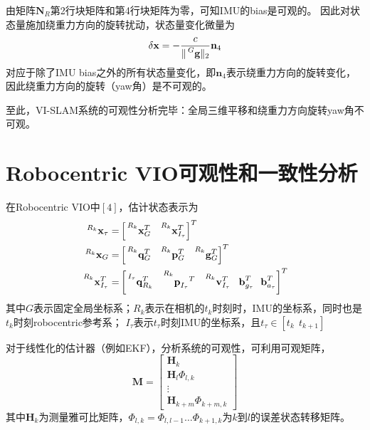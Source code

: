 \documentclass{article}
\begin{document}
由矩阵$\textbf{N}_R$第2行块矩阵和第4行块矩阵为零，可知IMU的bias是可观的。
因此对状态量施加绕重力方向的旋转扰动，状态量变化微量为
\begin{equation}
    \delta\textbf{x}=-\frac{c}{\lVert\sideset{^G}{}{\mathop{\textbf{g}}}\rVert_2}\textbf{n}_{4}
\end{equation}
对应于除了IMU bias之外的所有状态量变化，即$\textbf{n}_4$表示绕重力方向的旋转变化，因此绕重力方向的旋转（yaw角）是不可观的。

\par
至此，VI-SLAM系统的可观性分析完毕：全局三维平移和绕重力方向旋转yaw角不可观。

\section{Robocentric VIO可观性和一致性分析}
在Robocentric VIO中$\left[4\right]$，估计状态表示为
\begin{eqnarray}
    \sideset{^{R_k}}{}{\mathop{\textbf{x}_\tau}}
    =&\left[\sideset{^{R_k}}{}{\mathop{\textbf{x}_G^T}}\ \ \sideset{^{R_k}}{}{\mathop{\textbf{x}_{I_{\tau}}^T}}\right]^T\\
    \sideset{^{R_k}}{}{\mathop{\textbf{x}_G}}
    =&\left[\sideset{^{R_k}}{}{\mathop{\textbf{q}_{G}^T}}\ \ \sideset{^{R_k}}{}{\mathop{\textbf{p}_G^T}}
    \ \ \sideset{^{R_k}}{}{\mathop{\textbf{g}_G^T}}\right]^T\\
    \sideset{^{R_k}}{}{\mathop{\textbf{x}_{I_{\tau}}^T}}
    =&\left[\sideset{^{I_\tau}}{}{\mathop{\textbf{q}_{R_k}^T}}\ \ \sideset{^{R_k}}{}{\mathop{\textbf{p}_{I_\tau}}^T}
    \ \ \sideset{^{R_k}}{}{\mathop{\textbf{v}_{I_\tau}^T}}\ \ \textbf{b}_{g_\tau}^{T}
    \ \ \textbf{b}_{a_\tau}^{T}\right]^T\\
\end{eqnarray}
其中$G$表示固定全局坐标系；$R_k$表示在相机的$t_k$时刻时，IMU的坐标系，同时也是$t_k$时刻robocentric参考系；
$I_\tau$表示$t_\tau$时刻IMU的坐标系，且$t_\tau\in\left[t_k\ \ t_{k+1}\right]$

\par
对于线性化的估计器（例如EKF），分析系统的可观性，可利用可观矩阵，
\begin{equation}
\textbf{M}=\left[
    \begin{array}{c}
        \textbf{H}_{k}\\
        \textbf{H}_{l}\Phi_{l,k}\\
        \vdots\\
        \textbf{H}_{k+m}\Phi_{k+m,k}
    \end{array}\right]
\end{equation}
其中$\textbf{H}_k$为测量雅可比矩阵，$\Phi_{l,k}=\Phi_{l,l-1}\dots\Phi_{k+1,k}$为$k$到$l$的误差状态转移矩阵。
\end{document}
